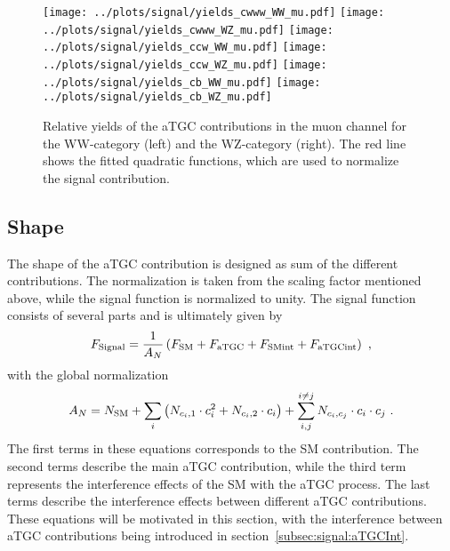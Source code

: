 \begin{figure}
	\centering
		\texttt{[image: ../plots/signal/yields\_cwww\_WW\_mu.pdf]}
		\texttt{[image: ../plots/signal/yields\_cwww\_WZ\_mu.pdf]}
		\texttt{[image: ../plots/signal/yields\_ccw\_WW\_mu.pdf]}
		\texttt{[image: ../plots/signal/yields\_ccw\_WZ\_mu.pdf]}
		\texttt{[image: ../plots/signal/yields\_cb\_WW\_mu.pdf]}
		\texttt{[image: ../plots/signal/yields\_cb\_WZ\_mu.pdf]}
	\caption[Relative yields of the aTGC contributions in the muon channel]{Relative yields of the aTGC contributions in the muon channel for the WW-category (left) and the WZ-category (right). The red line shows the fitted quadratic functions, which are used to normalize the signal contribution.}
	\label{fig:signal:atgcyields_mu}
\end{figure}

\subsection*{Shape}
The shape of the aTGC contribution is designed as sum of the different contributions. The normalization is taken from the scaling factor mentioned above, while the signal function is normalized to unity. The signal function consists of several parts and is ultimately given by
\begin{equation}
F_{\rm Signal} = \frac{1}{A_N} \left( F_{\rm SM} + F_{\rm aTGC} + F_{\rm SM int} + F_{\rm aTGC int} \right) ~,
\end{equation}
with the global normalization
\begin{equation}
A_N = N_{\rm SM} + \sum_i \left( N_{c_i,1}\cdot c_i^2 + N_{c_i,2}\cdot c_i \right) + \sum_{i,j}^{i \neq j} N_{c_i,c_j} \cdot c_i \cdot c_j ~.
\end{equation}
The first terms in these equations corresponds to the SM contribution. The second terms describe the main aTGC contribution, while the third term represents the interference effects of the SM with the aTGC process. The last terms describe the interference effects between different aTGC contributions. These equations will be motivated in this section, with the interference between aTGC contributions being introduced in section~\ref{subsec:signal:aTGCInt}.\\

